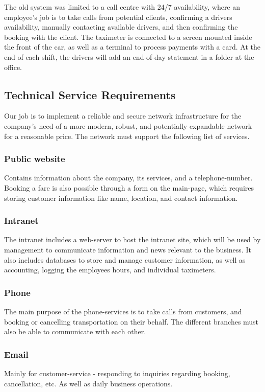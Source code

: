 The old system was limited to a call centre with 24/7 availability, where an employee's job is to take calls from potential clients, confirming a drivers availability, manually contacting available drivers, and then confirming the booking with the client. The taximeter is connected to a screen mounted inside the front of the car, as well as a terminal to process payments with a card. At the end of each shift, the drivers will add an end-of-day statement in a folder at the office. 


\subsection{Technical Service Requirements}
Our job is to implement a reliable and secure network infrastructure for the company's need of a more modern, robust, and potentially expandable network for a reasonable price. 
The network must support the following list of services.

\subsubsection{Public website}
Contains information about the company, its services, and a telephone-number. 
Booking a fare is also possible through a form on the main-page, which requires storing customer information like name, location, and contact information.

\subsubsection{Intranet}
The intranet includes a web-server to host the intranet site, which will be used by management to communicate information and news relevant to the business. 
It also includes databases to store and manage customer information, as well as accounting, logging the employees hours, and individual taximeters.

\subsubsection{Phone}
The main purpose of the phone-services is to take calls from customers, and booking or cancelling transportation on their behalf. The different branches must also be able to communicate with each other.

\subsubsection{Email}
Mainly for customer-service - responding to inquiries regarding booking, cancellation, etc.
As well as daily business operations.

